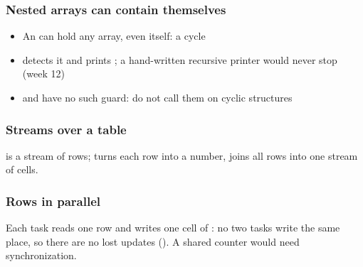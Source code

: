 \documentclass[aspectratio=169,10pt,compress]{beamer}
\begin{document}
\begin{frame}[t,fragile] \frametitle{Nested arrays can contain themselves}

	\begin{itemize}\footnotesize
		\item An  can hold any array, even itself: a cycle
		\item {} detects it and prints \hCode{[...]}; a hand-written recursive printer would
			  never stop (week 12)
		\item {} and  have no such guard: do not call them on cyclic structures
	\end{itemize}
\end{frame}








\begin{frame}[t,fragile] \frametitle{Streams over a table}

	\footnotesize {} is a stream of rows;  turns each row into a number,
	 joins all rows into one stream of cells.
\end{frame}




\begin{frame}[t,fragile] \frametitle{Rows in parallel}

	\footnotesize Each task reads one row and writes one cell of : no two tasks write the same place,
	so there are no lost updates (). A shared counter would need synchronization.
\end{frame}
\end{document}
